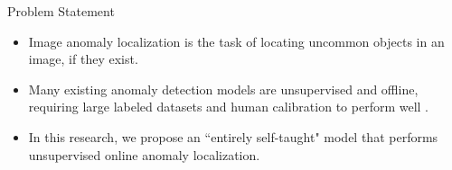 \documentclass[10pt,handout]{beamer}
\newcommand{\tabimg}[2]{\begin{tabular}{c}\texttt{[image: \#1]}\end{tabular}}
\begin{document}
%
%
%
%
%
%


\begin{frame}{Problem Statement}
\begin{itemize}
\item \alert{Image anomaly localization} is the task of locating uncommon objects in an image, if they exist.

\item Many existing anomaly detection models are unsupervised and offline, requiring large labeled datasets and human calibration to perform well \cite{wta_detection, attention_anomalies}.

\item In this research, we propose an ``entirely self-taught" model that performs \alert{unsupervised online anomaly localization}.\\[4mm]



\end{itemize}
\end{frame}
\end{document}
